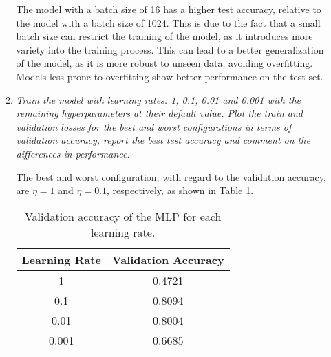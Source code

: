 \documentclass[12pt]{article}
\begin{document}
\begin{enumerate}[leftmargin=\labelsep]
\begin{enumerate}[label=\alph*)]
                    The model with a batch size of 16 has a higher test accuracy, relative to the model with a batch size of 1024. This is due to the fact that a small batch size can restrict the training of the model, as it introduces more variety into the training process. This can lead to a better generalization of the model, as it is more robust to unseen data, avoiding overfitting. Models less prone to overfitting show better performance on the test set.

                    \vspace{12pt}

              \item \textit{Train the model with learning rates: 1, 0.1, 0.01 and 0.001 with the remaining
                        hyperparameters at their default value. Plot the train and validation losses for the best
                        and worst configurations in terms of validation accuracy, report the best test accuracy
                        and comment on the differences in performance.}

                    \vspace{12pt}

                    The best and worst configuration, with regard to the validation accuracy, are $\eta = 1$ and $\eta = 0.1$, respectively, as shown in Table \ref{tab:mlp-learning-rate-validation-accuracy}.

                    \begin{table}[H]
                        \centering
                        \begin{tabular}{|c|c|}
                            \hline
                            \textbf{Learning Rate} & \textbf{Validation Accuracy} \\ \hline
                            1                      & 0.4721                       \\ \hline
                            0.1                    & 0.8094                       \\ \hline
                            0.01                   & 0.8004                       \\ \hline
                            0.001                  & 0.6685                       \\ \hline
                        \end{tabular}
                        \caption{Validation accuracy of the MLP for each learning rate.}
                        \label{tab:mlp-learning-rate-validation-accuracy}
                    \end{table}


\end{enumerate}
\end{enumerate}
\end{document}
